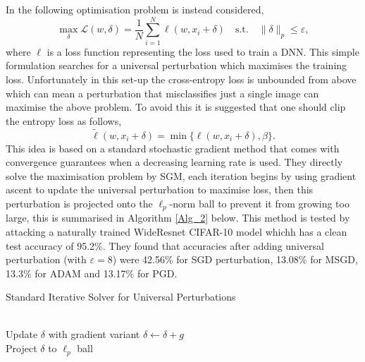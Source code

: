 \documentclass[12pt]{article}
\begin{document}
In \cite{shafahi_universal_2018} the following optimisation problem is instead considered, 
$$\max_{\delta} \mathcal{L} (w,\delta) = \frac{1}{N} \sum_{i=1}^N \ell(w,x_i + \delta) \quad \text{s.t.} \quad \| \delta \|_p \leq \varepsilon,$$ 
where $\ell$ is a loss function representing the loss used to train a DNN. This simple formulation searches for a universal perturbation which maximises the training loss. Unfortunately in this set-up the cross-entropy loss is unbounded from above which can mean a perturbation that misclassifies just a single image can maximise the above problem. To avoid this it is suggested that one should clip the entropy loss as follows, 
$$\tilde{\ell}(w,x_i + \delta) = \min \{ \ell(w,x_i+\delta), \beta \}.$$ 
This idea is based on a standard stochastic gradient method that comes with convergence guarantees when a decreasing learning rate is used. They directly solve the maximisation problem by SGM, each iteration begins by using gradient ascent to update the universal perturbation to maximise loss, then this perturbation is projected onto the $\ell_p$-norm ball to prevent it from growing too large, this is summarised in Algorithm \ref{Alg_2} below. This method is tested by attacking a naturally trained WideResnet CIFAR-10 model whichh has a clean test accuracy of 95.2\%. They found that accuracies after adding universal perturbation (with $\varepsilon =8$) were 42.56\% for SGD perturbation, 13.08\% for MSGD, 13.3\% for ADAM and 13.17\% for PGD.
\begin{algorithm}
\caption{Standard Iterative Solver for Universal Perturbations}\label{Alg_2}
\begin{algorithmic}[1]



 \\
\hspace{\algorithmicindent} Update $\delta$ with gradient variant $\delta \gets \delta + g$ \\
\hspace{\algorithmicindent} Project $\delta$ to $\ell_p$ ball


\EndFor
\EndFor
\end{algorithmic}
\end{algorithm}
\end{document}
